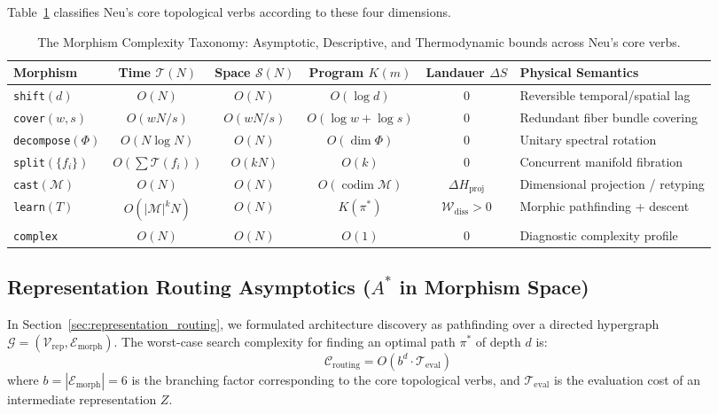 \documentclass[11pt]{article}
\begin{document}
Table~\ref{tab:morphism_complexity} classifies Neu's core topological verbs according to these four dimensions.

\begin{table}[htbp]
\centering
\small\sffamily
\begin{tabularx}{\textwidth}{lcccc>{\raggedright\arraybackslash}X}
\toprule
\textbf{Morphism} & \textbf{Time } $\mathcal{T}(N)$ & \textbf{Space } $\mathcal{S}(N)$ & \textbf{Program } $K(m)$ & \textbf{Landauer } $\Delta S$ & \textbf{Physical Semantics} \\
\midrule
\texttt{shift}$(d)$ & $O(N)$ & $O(N)$ & $O(\log d)$ & $0$ & Reversible temporal/spatial lag \\
\texttt{cover}$(w, s)$ & $O(w N/s)$ & $O(w N/s)$ & $O(\log w + \log s)$ & $0$ & Redundant fiber bundle covering \\
\texttt{decompose}$(\Phi)$ & $O(N \log N)$ & $O(N)$ & $O(\dim \Phi)$ & $0$ & Unitary spectral rotation \\
\texttt{split}$(\{f_i\})$ & $O(\sum \mathcal{T}(f_i))$ & $O(k N)$ & $O(k)$ & $0$ & Concurrent manifold fibration \\
\texttt{cast}$(\mathcal{M})$ & $O(N)$ & $O(N)$ & $O(\operatorname{codim} \mathcal{M})$ & $\Delta H_{\text{proj}}$ & Dimensional projection / retyping \\
\texttt{learn}$(T)$ & $O(|\mathcal{M}|^k N)$ & $O(N)$ & $K(\pi^*)$ & $\mathcal{W}_{\text{diss}} > 0$ & Morphic pathfinding + descent \\
\texttt{complex} & $O(N)$ & $O(N)$ & $O(1)$ & $0$ & Diagnostic complexity profile \\
\bottomrule
\end{tabularx}
\vspace{0.4em}
\caption{The Morphism Complexity Taxonomy: Asymptotic, Descriptive, and Thermodynamic bounds across Neu's core verbs.}
\label{tab:morphism_complexity}
\end{table}

\subsection{Representation Routing Asymptotics (\texorpdfstring{$A^*$}{A*} in Morphism Space)}
In Section~\ref{sec:representation_routing}, we formulated architecture discovery as pathfinding over a directed hypergraph $\mathcal{G} = (\mathcal{V}_{\text{rep}}, \mathcal{E}_{\text{morph}})$. The worst-case search complexity for finding an optimal path $\pi^*$ of depth $d$ is:
\begin{equation}
\mathcal{C}_{\text{routing}} = O\left( b^d \cdot \mathcal{T}_{\text{eval}} \right)
\end{equation}
where $b = |\mathcal{E}_{\text{morph}}| = 6$ is the branching factor corresponding to the core topological verbs, and $\mathcal{T}_{\text{eval}}$ is the evaluation cost of an intermediate representation $Z$.
\end{document}
